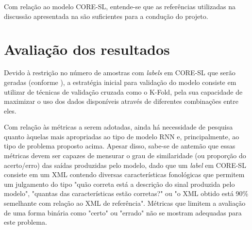 Com relação ao modelo CORE-SL, entende-se que as referências utilizadas na discussão apresentada na  são suficientes para a condução do projeto.

\section{Avaliação dos resultados}
Devido à restrição no número de amostras com \textit{labels} em CORE-SL que serão geradas (conforme ), a estratégia inicial para validação do modelo consiste em utilizar de técnicas de validação cruzada como o K-Fold, pela sua capacidade de maximizar o uso dos dados disponíveis através de diferentes combinações entre eles.

Com relação às métricas a serem adotadas, ainda há necessidade de pesquisa quanto àquelas mais apropriadas ao tipo de modelo RNN e, principalmente, ao tipo de problema proposto acima. Apesar disso, sabe-se de antemão que essas métricas devem ser capazes de mensurar o grau de similaridade (ou proporção do acerto/erro) das saídas produzidas pelo modelo, dado que um \textit{label} em CORE-SL consiste em um XML contendo diversas características fonológicas que permitem um julgamento do tipo "quão correta está a descrição do sinal produzida pelo modelo", "quantas das características estão corretas?" ou "o XML obtido está 90\% semelhante com relação ao XML de referência". Métricas que limitem a avaliação de uma forma binária como "certo" ou "errado" não se mostram adequadas para este problema.


\printbibliography


